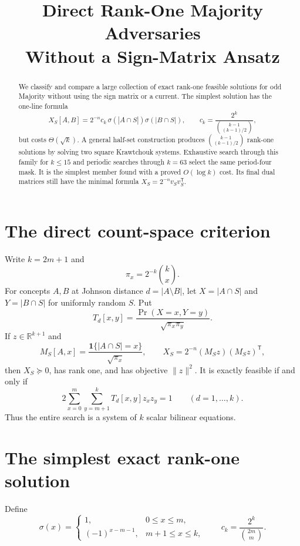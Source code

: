 \documentclass[11pt]{article}
\title{Direct Rank-One Majority Adversaries\\Without a Sign-Matrix Ansatz}
\author{}
\date{}
\newcommand{\1}{\mathbf 1}
\newcommand{\norm}[1]{\lVert#1\rVert}
\begin{document}
\maketitle

\begin{abstract}
We classify and compare a large collection of exact rank-one feasible
solutions for odd Majority without using the sign matrix or a current.
The simplest solution has the one-line formula
\[
 X_S[A,B]=2^{-n}c_k\,\sigma(|A\cap S|)\sigma(|B\cap S|),
 \qquad c_k=\frac{2^k}{\binom{k-1}{(k-1)/2}},
\]
but costs $\Theta(\sqrt{k})$.  A general half-set construction produces
$\binom{k-1}{(k-1)/2}$ rank-one solutions by solving two square
Krawtchouk systems.  Exhaustive search through this family for $k\le15$
and periodic searches through $k=63$ select the same period-four mask.
It is the simplest member found with a proved $O(\log k)$ cost.  Its final
dual matrices still have the minimal formula $X_S=2^{-n}v_Sv_S^{\mathsf T}$.
\end{abstract}

\section{The direct count-space criterion}

Write $k=2m+1$ and
\[
 \pi_x=2^{-k}\binom{k}{x}.
\]
For concepts $A,B$ at Johnson distance $d=|A\setminus B|$, let
$X=|A\cap S|$ and $Y=|B\cap S|$ for uniformly random $S$.  Put
\[
 T_d[x,y]=\frac{\Pr(X=x,Y=y)}{\sqrt{\pi_x\pi_y}}.
\]
If $z\in\mathbb R^{k+1}$ and
\[
 M_S[A,x]=\frac{\1\{|A\cap S|=x\}}{\sqrt{\pi_x}},
 \qquad
 X_S=2^{-n}(M_Sz)(M_Sz)^{\mathsf T},                    \tag{1}
\]
then $X_S\succeq0$, has rank one, and has objective $\norm z^2$.
It is exactly feasible if and only if
\begin{equation}
 2\sum_{x=0}^{m}\sum_{y=m+1}^{k}T_d[x,y]z_xz_y=1
 \qquad(d=1,\ldots,k).                                  \tag{2}
\end{equation}
Thus the entire search is a system of $k$ scalar bilinear equations.

\section{The simplest exact rank-one solution}

Define
\[
 \sigma(x)=
 \begin{cases}
  1,&0\le x\le m,\\
  (-1)^{x-m-1},&m+1\le x\le k,
 \end{cases}
 \qquad
 c_k=\frac{2^k}{\binom{2m}{m}}.                         \tag{3}
\]
\end{document}
